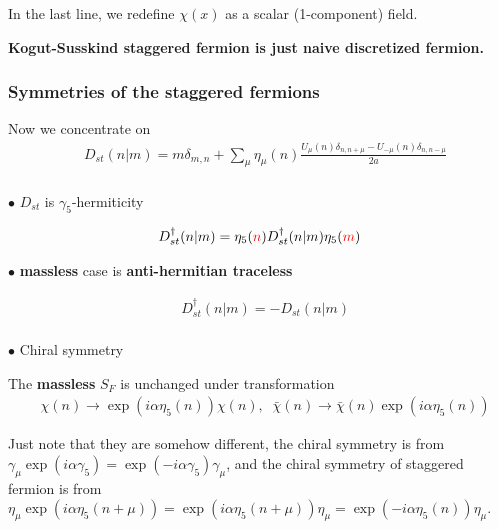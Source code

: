 In the last line, we redefine $\chi(x)$ as a scalar (1-component) field.

\textcolor[rgb]{0,0,1}{\textbf{Kogut-Susskind staggered fermion is just naive discretized fermion.}}

\subsubsection{\label{sec:staggeredchiral}Symmetries of the staggered fermions}

Now we concentrate on
\begin{equation}
\begin{split}
&D_{st}(n|m)=m\delta _{m,n} + \sum _{\mu}\eta _{\mu}(n)\frac{U_{\mu}(n) \delta _{n,n+\mu} - U_{-\mu}(n)\delta _{n,n-\mu}}{2a}\\
\end{split}
\end{equation}

$\bullet$ $D_{st}$ is $\gamma _5$-hermiticity

\begin{equation}
\begin{split}
&D_{st}^{\dagger}(n|m)=\eta _5(\textcolor[rgb]{1,0,0}{n}) D_{st}^{\dagger}(n|m) \eta _5(\textcolor[rgb]{1,0,0}{m})\\
\end{split}
\end{equation}


$\bullet$ \textbf{massless} case is \textbf{anti-hermitian traceless}

\begin{equation}
\begin{split}
&D_{st}^{\dagger}(n|m)=-D_{st}(n|m)\\
\end{split}
\end{equation}

$\bullet$ Chiral symmetry

The \textbf{massless} $S_F$ is unchanged under transformation
\begin{equation}
\begin{split}
&\chi (n) \to \exp ( i \alpha \eta _5(n))\chi (n),\;\; \bar{\chi} (n) \to \bar{\chi} (n) \exp ( i \alpha \eta _5(n))
\end{split}
\end{equation}

Just note that they are somehow different, the chiral symmetry is from $\gamma _{\mu} \exp(i\alpha \gamma _5)=\exp(-i\alpha \gamma _5) \gamma _{\mu}$, and the chiral symmetry of staggered fermion is from $\eta _{\mu} \exp(i\alpha \eta _5(n+\mu))=\exp(i\alpha \eta _5(n+\mu)) \eta _{\mu} = \exp(-i\alpha \eta _5(n)) \eta _{\mu}$.


